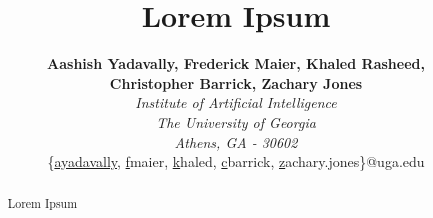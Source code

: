 \documentclass[11pt, twocolumn]{article}
\title{Lorem Ipsum}
\author{
    \Large\textbf{Aashish Yadavally, Frederick Maier, Khaled Rasheed,} \\
    \Large\textbf{Christopher Barrick, Zachary Jones} \vspace{0.1cm}\\
    \textit{Institute of Artificial Intelligence}\\
    \textit{The University of Georgia}\\
    \textit{Athens, GA - 30602}\\
    \{\href{mailto:ayadavally@uga.edu}{ayadavally}, \href{mailto:fmaier@uga.edu}fmaier,
    \href{mailto:khaled@uga.edu}khaled, \href{mailto:cbarrick@uga.edu}cbarrick,
    \href{mailto:zachary.jones@uga.edu}zachary.jones\}@uga.edu
}
\date{}
\begin{document}
\maketitle
\begin{abstract}
    Lorem Ipsum
\end{abstract}





\printbibliography
\end{document}
